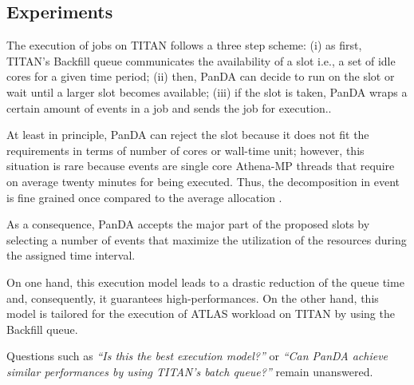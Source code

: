 
\subsection{Experiments}

The execution of jobs on TITAN follows a three step scheme: (i) as first,
TITAN's Backfill queue communicates  the availability of a slot i.e., a set of
idle cores for a given time period; (ii) then, PanDA can decide to run on the
slot or wait until a larger slot becomes available; (iii) if the slot is taken,
PanDA wraps a certain amount of events in a job and sends the job for
execution..

At least in principle, PanDA can reject the slot because it does not fit the
requirements in terms of number of cores or wall-time unit; however, this
situation is rare because events are single core Athena-MP threads that require on
average twenty minutes for being executed. Thus, the decomposition in event is
fine grained once compared to the average allocation .

As a consequence, PanDA accepts the major part of the proposed slots by
selecting a number of events that maximize the utilization of the resources
during the assigned time interval.

On one hand, this
execution model leads to a drastic reduction of the queue time and,
consequently, it guarantees high-performances. On the other hand, this model is
tailored for the execution of ATLAS workload on TITAN by using the Backfill
queue.

Questions such as \emph{``Is this the best execution model?''} or \emph{``Can PanDA achieve similar performances by using TITAN's batch queue?''}  remain unanswered.

